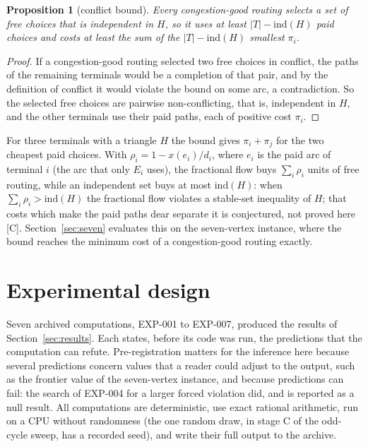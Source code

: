 \documentclass[11pt]{article}
\newtheorem{proposition}{Proposition}
\theoremstyle{remark}
\newcommand{\EXP}[1]{\mbox{EXP-#1}}
\begin{document}
\begin{proposition}[conflict bound]
\label{prop:conflict}
Every congestion-good routing selects a set of free choices that is independent in $H$, so it uses at least $|T|-\mathrm{ind}(H)$ paid choices and costs at least the sum of the $|T|-\mathrm{ind}(H)$ smallest $\pi_i$.
\end{proposition}

\begin{proof}
If a congestion-good routing selected two free choices in conflict, the paths of the remaining terminals would be a completion of that pair, and by the definition of conflict it would violate the bound on some arc,
a contradiction. So the selected free choices are pairwise non-conflicting, that is, independent in $H$, and the other terminals use their paid paths, each of positive cost $\pi_i$.
\end{proof}

For three terminals with a triangle $H$ the bound gives $\pi_i+\pi_j$ for the two cheapest paid choices. With $\rho_i=1-x(e_i)/d_i$, where $e_i$ is the paid arc of terminal $i$ (the arc that only $E_i$ uses), the fractional flow buys $\sum_i\rho_i$ units of free routing, while an independent set
buys at most $\mathrm{ind}(H)$: when $\sum_i\rho_i>\mathrm{ind}(H)$ the fractional flow violates a stable-set inequality of $H$; that costs which make the paid paths dear separate it is conjectured, not proved here [C]. Section~\ref{sec:seven} evaluates this
on the seven-vertex instance, where the bound reaches the minimum cost of a congestion-good routing exactly.

\section{Experimental design}
\label{sec:design}

Seven archived computations, \EXP{001} to \EXP{007}, produced the results of Section~\ref{sec:results}. Each states, before its code was run, the predictions that
the computation can refute. Pre-registration matters for the inference here because several predictions concern values that a reader could adjust to the output, such as the frontier
value of the seven-vertex instance, and because predictions can fail: the search of \EXP{004} for a larger forced violation did, and is reported as a null result. All computations are deterministic, use exact rational arithmetic, run on a CPU without randomness
(the one random draw, in stage C of the odd-cycle sweep, has a recorded seed), and write their full output to the archive.
\end{document}
